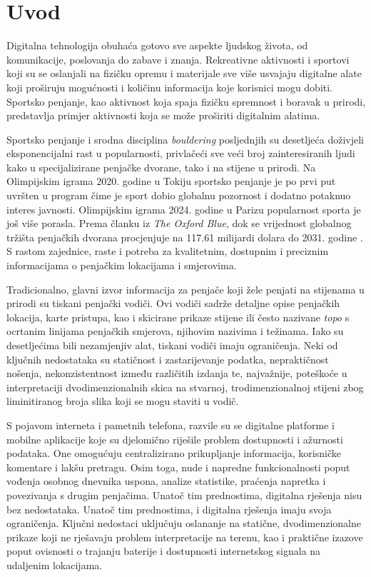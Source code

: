 \chapter{Uvod}

Digitalna tehnologija obuhaća gotovo sve aspekte ljudskog života, od komunikacije, poslovanja do zabave i znanja. Rekreativne aktivnosti i sportovi koji su se oslanjali na fizičku opremu i materijale sve više usvajaju digitalne alate koji proširuju mogućnosti i količinu informacija koje korisnici mogu dobiti. Sportsko penjanje, kao aktivnost koja spaja fizičku spremnost i boravak u prirodi, predstavlja primjer aktivnosti koja se može proširiti digitalnim alatima.

Sportsko penjanje i srodna disciplina \textit{bouldering} posljednjih su desetljeća doživjeli eksponencijalni rast u popularnosti, privlačeći sve veći broj zainteresiranih ljudi kako u specijalizirane penjačke dvorane, tako i na stijene u prirodi. Na Olimpijskim igrama 2020. godine u Tokiju sportsko penjanje je po prvi put uvršten u program čime je sport dobio globalnu pozornost i dodatno potaknuo interes javnosti. Olimpijskim igrama 2024. godine u Parizu popularnost sporta je još više porasla. Prema članku iz \textit{The Oxford Blue}, dok se vrijednost globalnog tržišta penjačkih dvorana procjenjuje na 117.61 milijardi dolara do 2031. godine \cite{the_oxford_blue_rock_climb}. S rastom zajednice, raste i potreba za kvalitetnim, dostupnim i preciznim informacijama o penjačkim lokacijama i smjerovima. 

Tradicionalno, glavni izvor informacija za penjače koji žele penjati na stijenama u prirodi su tiskani penjački vodiči. Ovi vodiči sadrže detaljne opise penjačkih lokacija, karte pristupa, kao i skicirane prikaze stijene ili često nazivane \textit{topo} s ocrtanim linijama penjačkih smjerova, njihovim nazivima i težinama. Iako su desetljećima bili nezamjenjiv alat, tiskani vodiči imaju ograničenja. Neki od ključnih nedostataka su statičnost i zastarijevanje podatka, nepraktičnost nošenja, nekonzistentnost između različitih izdanja te, najvažnije, poteškoće u interpretaciji dvodimenzionalnih skica na stvarnoj, trodimenzionalnoj stijeni zbog liminitiranog broja slika koji se mogu staviti u vodič.

S pojavom interneta i pametnih telefona, razvile su se digitalne platforme i mobilne aplikacije koje su djelomično riješile problem dostupnosti i ažurnosti podataka. One omogućuju centralizirano prikupljanje informacija, korisničke komentare i lakšu pretragu. Osim toga, nude i napredne funkcionalnosti poput vođenja osobnog dnevnika uspona, analize statistike, praćenja napretka i povezivanja s drugim penjačima.
Unatoč tim prednostima, digitalna rješenja nisu bez nedostataka. Unatoč tim prednostima, i digitalna rješenja imaju svoja ograničenja. Ključni nedostaci uključuju oslananje na statične, dvodimenzionalne prikaze koji ne rješavaju problem interpretacije na terenu, kao i praktične izazove poput ovisnosti o trajanju baterije i dostupnosti internetskog signala na udaljenim lokacijama.

